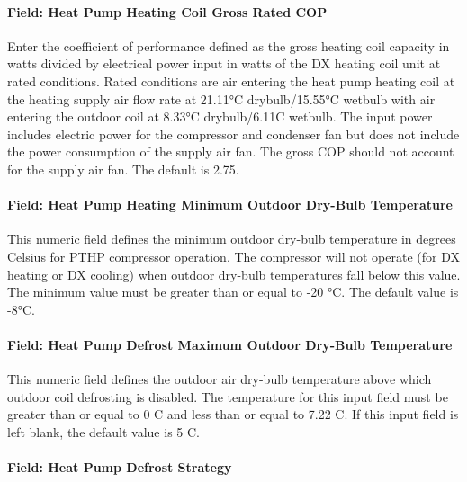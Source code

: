 \paragraph{Field: Heat Pump Heating Coil Gross Rated COP}\label{field-heat-pump-heating-coil-gross-rated-cop}

Enter the coefficient of performance defined as the gross heating coil capacity in watts divided by electrical power input in watts of the DX heating coil unit at rated conditions. Rated conditions are air entering the heat pump heating coil at the heating supply air flow rate at 21.11°C drybulb/15.55°C wetbulb with air entering the outdoor coil at 8.33°C drybulb/6.11C wetbulb. The input power includes electric power for the compressor and condenser fan but does not include the power consumption of the supply air fan. The gross COP should not account for the supply air fan. The default is 2.75.

\paragraph{Field: Heat Pump Heating Minimum Outdoor Dry-Bulb Temperature}\label{field-heat-pump-heating-minimum-outdoor-dry-bulb-temperature}

This numeric field defines the minimum outdoor dry-bulb temperature in degrees Celsius for PTHP compressor operation. The compressor will not operate (for DX heating or DX cooling) when outdoor dry-bulb temperatures fall below this value. The minimum value must be greater than or equal to -20 °C. The default value is -8°C.

\paragraph{Field: Heat Pump Defrost Maximum Outdoor Dry-Bulb Temperature}\label{field-heat-pump-defrost-maximum-outdoor-dry-bulb-temperature}

This numeric field defines the outdoor air dry-bulb temperature above which outdoor coil defrosting is disabled. The temperature for this input field must be greater than or equal to 0 C and less than or equal to 7.22 C. If this input field is left blank, the default value is 5 C.

\paragraph{Field: Heat Pump Defrost Strategy}\label{field-heat-pump-defrost-strategy}

